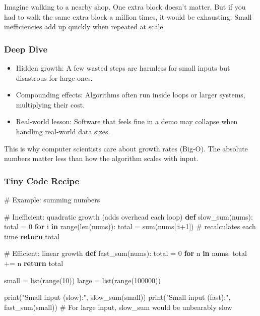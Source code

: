 \documentclass[
  letterpaper,
  DIV=11,
  numbers=noendperiod]{scrreprt}
\newenvironment{Shaded}{\begin{snugshade}}{\end{snugshade}}
\newcommand{\BuiltInTok}[1]{\textcolor[rgb]{0.00,0.23,0.31}{#1}}
\newcommand{\CommentTok}[1]{\textcolor[rgb]{0.37,0.37,0.37}{#1}}
\newcommand{\ControlFlowTok}[1]{\textcolor[rgb]{0.00,0.23,0.31}{\textbf{#1}}}
\newcommand{\DecValTok}[1]{\textcolor[rgb]{0.68,0.00,0.00}{#1}}
\newcommand{\KeywordTok}[1]{\textcolor[rgb]{0.00,0.23,0.31}{\textbf{#1}}}
\newcommand{\NormalTok}[1]{\textcolor[rgb]{0.00,0.23,0.31}{#1}}
\newcommand{\OperatorTok}[1]{\textcolor[rgb]{0.37,0.37,0.37}{#1}}
\newcommand{\StringTok}[1]{\textcolor[rgb]{0.13,0.47,0.30}{#1}}
\providecommand{\tightlist}{%
  \setlength{\itemsep}{0pt}\setlength{\parskip}{0pt}}
\begin{document}
Imagine walking to a nearby shop. One extra block doesn't matter. But if
you had to walk the same extra block a million times, it would be
exhausting. Small inefficiencies add up quickly when repeated at scale.

\subsubsection{Deep Dive}\label{deep-dive-46}

\begin{itemize}
\tightlist
\item
  Hidden growth: A few wasted steps are harmless for small inputs but
  disastrous for large ones.
\item
  Compounding effects: Algorithms often run inside loops or larger
  systems, multiplying their cost.
\item
  Real-world lesson: Software that feels fine in a demo may collapse
  when handling real-world data sizes.
\end{itemize}

This is why computer scientists care about growth rates (Big-O). The
absolute numbers matter less than how the algorithm scales with input.

\subsubsection{Tiny Code Recipe}\label{tiny-code-recipe-74}

\begin{Shaded}
\begin{Highlighting}[]
\CommentTok{\# Example: summing numbers}

\CommentTok{\# Inefficient: quadratic growth (adds overhead each loop)}
\KeywordTok{def}\NormalTok{ slow\_sum(nums):}
\NormalTok{    total }\OperatorTok{=} \DecValTok{0}
    \ControlFlowTok{for}\NormalTok{ i }\KeywordTok{in} \BuiltInTok{range}\NormalTok{(}\BuiltInTok{len}\NormalTok{(nums)):}
\NormalTok{        total }\OperatorTok{=} \BuiltInTok{sum}\NormalTok{(nums[:i}\OperatorTok{+}\DecValTok{1}\NormalTok{])  }\CommentTok{\# recalculates each time}
    \ControlFlowTok{return}\NormalTok{ total}

\CommentTok{\# Efficient: linear growth}
\KeywordTok{def}\NormalTok{ fast\_sum(nums):}
\NormalTok{    total }\OperatorTok{=} \DecValTok{0}
    \ControlFlowTok{for}\NormalTok{ n }\KeywordTok{in}\NormalTok{ nums:}
\NormalTok{        total }\OperatorTok{+=}\NormalTok{ n}
    \ControlFlowTok{return}\NormalTok{ total}

\NormalTok{small }\OperatorTok{=} \BuiltInTok{list}\NormalTok{(}\BuiltInTok{range}\NormalTok{(}\DecValTok{10}\NormalTok{))}
\NormalTok{large }\OperatorTok{=} \BuiltInTok{list}\NormalTok{(}\BuiltInTok{range}\NormalTok{(}\DecValTok{100000}\NormalTok{))}

\BuiltInTok{print}\NormalTok{(}\StringTok{"Small input (slow):"}\NormalTok{, slow\_sum(small))}
\BuiltInTok{print}\NormalTok{(}\StringTok{"Small input (fast):"}\NormalTok{, fast\_sum(small))}
\CommentTok{\# For large input, slow\_sum would be unbearably slow}
\end{Highlighting}
\end{Shaded}
\end{document}
